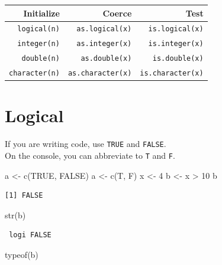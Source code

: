 \documentclass[
]{book}
\newenvironment{Shaded}{\begin{snugshade}}{\end{snugshade}}
\newcommand{\ConstantTok}[1]{\textcolor[rgb]{0.00,0.00,0.00}{#1}}
\newcommand{\DecValTok}[1]{\textcolor[rgb]{0.00,0.00,0.81}{#1}}
\newcommand{\FunctionTok}[1]{\textcolor[rgb]{0.00,0.00,0.00}{#1}}
\newcommand{\NormalTok}[1]{#1}
\newcommand{\OtherTok}[1]{\textcolor[rgb]{0.56,0.35,0.01}{#1}}
\newcommand{\SpecialCharTok}[1]{\textcolor[rgb]{0.00,0.00,0.00}{#1}}
\begin{document}
\begin{longtable}[]{@{}rrr@{}}
\toprule
\textbf{Initialize} & \textbf{Coerce} & \textbf{Test}\tabularnewline
\midrule
\endhead
\texttt{logical(n)} & \texttt{as.logical(x)} & \texttt{is.logical(x)}\tabularnewline
\texttt{integer(n)} & \texttt{as.integer(x)} & \texttt{is.integer(x)}\tabularnewline
\texttt{double(n)} & \texttt{as.double(x)} & \texttt{is.double(x)}\tabularnewline
\texttt{character(n)} & \texttt{as.character(x)} & \texttt{is.character(x)}\tabularnewline
\bottomrule
\end{longtable}

\hypertarget{logical}{%
\section{Logical}\label{logical}}

If you are writing code, use \texttt{TRUE} and \texttt{FALSE}.\\
On the console, you can abbreviate to \texttt{T} and \texttt{F}.

\begin{Shaded}
\begin{Highlighting}[]
\NormalTok{a }\OtherTok{\textless{}{-}} \FunctionTok{c}\NormalTok{(}\ConstantTok{TRUE}\NormalTok{, }\ConstantTok{FALSE}\NormalTok{)}
\NormalTok{a }\OtherTok{\textless{}{-}} \FunctionTok{c}\NormalTok{(T, F)}
\NormalTok{x }\OtherTok{\textless{}{-}} \DecValTok{4}
\NormalTok{b }\OtherTok{\textless{}{-}}\NormalTok{ x }\SpecialCharTok{\textgreater{}} \DecValTok{10}
\NormalTok{b}
\end{Highlighting}
\end{Shaded}

\begin{verbatim}
[1] FALSE
\end{verbatim}

\begin{Shaded}
\begin{Highlighting}[]
\FunctionTok{str}\NormalTok{(b)}
\end{Highlighting}
\end{Shaded}

\begin{verbatim}
 logi FALSE
\end{verbatim}

\begin{Shaded}
\begin{Highlighting}[]
\FunctionTok{typeof}\NormalTok{(b)}
\end{Highlighting}
\end{Shaded}
\end{document}
